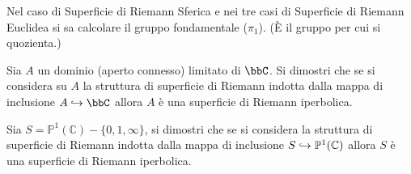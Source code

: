 
\begin{osservazione}
Nel caso di Superficie di Riemann Sferica e nei tre casi di Superficie di Riemann Euclidea si sa calcolare il gruppo fondamentale ($\pi_1$). (È il gruppo per cui si quozienta.)
\end{osservazione}

\begin{esercizio}
Sia $A$ un dominio (aperto connesso) limitato di $\bbC$. Si dimostri che se si considera su $A$ la struttura di superficie di Riemann indotta dalla mappa di inclusione $A\hrar\bbC$ allora $A$ è una superficie di Riemann iperbolica.
\end{esercizio}



\begin{esercizio}Sia $S=\mathbb{P}^1(\mathbb{C})\minus\{0,1,\infty\}$, si dimostri che se si considera la struttura di superficie di Riemann indotta dalla mappa di inclusione $S\hookrightarrow\mathbb{P}^1(\mathbb{C})$ allora $S$ è una superficie di Riemann iperbolica.
\end{esercizio}


